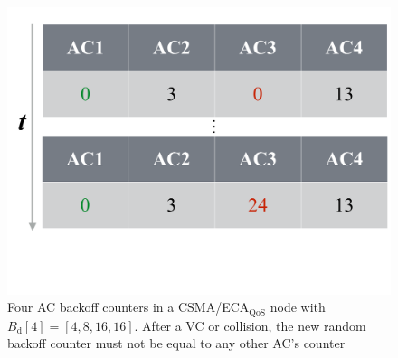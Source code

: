 	\begin{figure}[tb]
	\centering
		\includegraphics[width=0.8\linewidth]{figures/smartBackoff1.pdf}
		\caption{Four AC backoff counters in a CSMA/ECA$_{\text{QoS}}$ node with $B_{\text{d}}[4]=[4,8,16,16]$. After a VC or collision, the new random backoff counter must not be equal to any other AC's counter}
		\label{fig:smartBackoff1}
	\end{figure}

